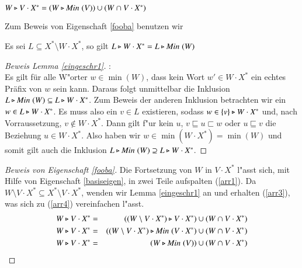 \begin{eigen}\label{fooba}
$W\triangleright V\cdot X^* = (W\triangleright\mathit{Min}\;(V)) \cup (W\cap V\cdot X^*)$
\end{eigen}
Zum Beweis von Eigenschaft \ref{fooba} benutzen wir

\vspace{2ex}

\begin{lem}\label{eingeschr1}
Es sei $L\subseteq X^*\setminus W\cdot X^*$, so gilt $L\triangleright W\cdot X^* = L\triangleright \mathit{Min}\;(W) $
\end{lem}
\begin{proof}[Beweis Lemma \ref{eingeschr1}]:\\
Es gilt für alle W"orter $w\in\min(W)$, dass kein Wort $w'\in W\cdot X^*$ ein echtes Präfix von $w$ sein kann.
Daraus folgt unmittelbar die Inklusion $L\triangleright \mathit{Min}\;(W) \subseteq L\triangleright W\cdot X^*$.
Zum Beweis der anderen Inklusion betrachten wir ein $w\in L\triangleright W\cdot X^*$. Es muss also ein $v\in L$ existieren, sodass $w\in \{v\}\triangleright W\cdot X^*$ und, nach Vorraussetzung, $v\notin W\cdot X^*$. Dann gilt f"ur kein $u$, $v\sqsubseteq u\sqsubset w$ oder $u\sqsubseteq v$ die Beziehung $u\in W\cdot X^*$.
Also haben wir $w\in\min(W\cdot X^*) = \min(W)$ und somit gilt auch die Inklusion $L\triangleright \mathit{Min}\;(W) \supseteq L\triangleright W\cdot X^*$.
\end{proof}

\begin{proof}[Beweis von Eigenschaft \ref{fooba}]
Die Fortsetzung von $W$ in $V\cdot X^*$ l"asst sich, mit Hilfe von Eigenschaft \ref{basiseigen}, in zwei Teile aufspalten (\ref{arr1}).
Da $W\setminus V\cdot X^* \subseteq X^*\setminus V\cdot X^*$, wenden wir Lemma \ref{eingeschr1} an und erhalten (\ref{arr3}), was sich zu (\ref{arr4}) vereinfachen l"asst.
\setcounter{equation}{0}
\begin{eqnarray}
W\triangleright V\cdot X^* & = & ((W\setminus V\cdot X^*) \triangleright V\cdot X^*) \cup (W\cap V\cdot X^*) \label{arr1}\\
W\triangleright V\cdot X^* & = & ((W\setminus V\cdot X^*)  \triangleright \mathit{Min}\;(V\cdot X^*) \cup (W\cap V\cdot X^*) \label{arr3} \\
W\triangleright V\cdot X^* & = &(W \triangleright \mathit{Min}\;(V)) \cup (W\cap V\cdot X^*) \label{arr4}
\end{eqnarray}
\end{proof}






